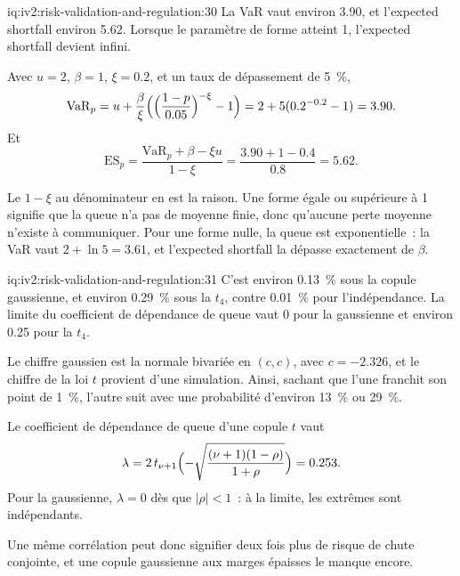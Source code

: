 \begin{solution}{iq:iv2:risk-validation-and-regulation:30}
La VaR vaut environ 3.90, et l'expected shortfall environ 5.62. Lorsque le paramètre de forme atteint 1, l'expected shortfall devient infini.

Avec $u = 2$, $\beta = 1$, $\xi = 0.2$, et un taux de dépassement de 5~\%,
\[
\mathrm{VaR}_p = u + \frac{\beta}{\xi}\Bigl(\Bigl(\frac{1 - p}{0.05}\Bigr)^{-\xi} - 1\Bigr) = 2 + 5(0.2^{-0.2} - 1) = 3.90.
\]
Et
\[
\mathrm{ES}_p = \frac{\mathrm{VaR}_p + \beta - \xi u}{1 - \xi} = \frac{3.90 + 1 - 0.4}{0.8} = 5.62.
\]

Le $1 - \xi$ au dénominateur en est la raison. Une forme égale ou supérieure à 1 signifie que la queue n'a pas de moyenne finie, donc qu'aucune perte moyenne n'existe à communiquer. Pour une forme nulle, la queue est exponentielle~: la VaR vaut $2 + \ln 5 = 3.61$, et l'expected shortfall la dépasse exactement de $\beta$.

\end{solution}

\begin{solution}{iq:iv2:risk-validation-and-regulation:31}
C'est environ 0.13~\% sous la copule gaussienne, et environ 0.29~\% sous la $t_4$, contre 0.01~\% pour l'indépendance. La limite du coefficient de dépendance de queue vaut 0 pour la gaussienne et environ 0.25 pour la $t_4$.

Le chiffre gaussien est la normale bivariée en $(c, c)$, avec $c = -2.326$, et le chiffre de la loi $t$ provient d'une simulation. Ainsi, sachant que l'une franchit son point de 1~\%, l'autre suit avec une probabilité d'environ 13~\% ou 29~\%.

Le coefficient de dépendance de queue d'une copule $t$ vaut
\[
\lambda = 2\,t_{\nu + 1}\Bigl(-\sqrt{\frac{(\nu + 1)(1 - \rho)}{1 + \rho}}\Bigr) = 0.253.
\]
Pour la gaussienne, $\lambda = 0$ dès que $|\rho| < 1$~: à la limite, les extrêmes sont indépendants.

Une même corrélation peut donc signifier deux fois plus de risque de chute conjointe, et une copule gaussienne aux marges épaisses le manque encore.

\end{solution}

